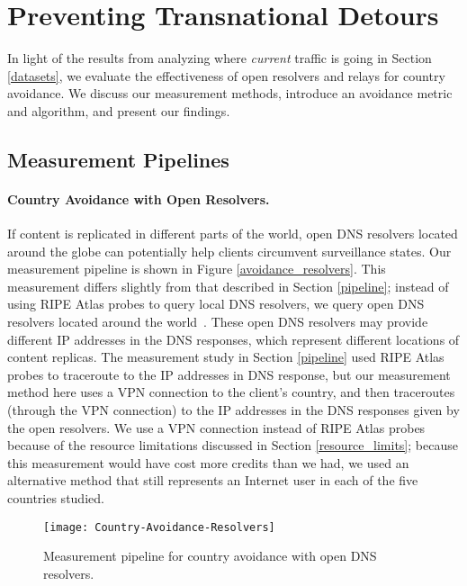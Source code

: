 \section{Preventing Transnational Detours}
\label{avoid_results}
In light of the results from analyzing where \textit{current} traffic is going in Section \ref{datasets}, we evaluate the effectiveness of open resolvers and relays for country avoidance.  We discuss our measurement methods, introduce an avoidance metric and algorithm, and present our findings.

\subsection{Measurement Pipelines}

\paragraph{Country Avoidance with Open Resolvers.} If content is replicated in different parts of the world, open DNS resolvers located around the globe can potentially help clients circumvent surveillance states.  Our measurement pipeline is shown in Figure \ref{avoidance_resolvers}.  This measurement differs slightly from that described in Section \ref{pipeline}; instead of using RIPE Atlas probes to query local DNS resolvers, we query open DNS resolvers located around the world~\cite{open_resolver_list}.  These open DNS resolvers may provide different IP addresses in the DNS responses, which represent different locations of content replicas. The measurement study in Section \ref{pipeline} used RIPE Atlas probes to traceroute to the IP addresses in DNS response, but our measurement method here uses a VPN connection to the client's country, and then traceroutes (through the VPN connection) to the IP addresses in the DNS responses given by the open resolvers.  We use a VPN connection instead of RIPE Atlas probes because of the resource limitations discussed in Section \ref{resource_limits}; because this measurement would have cost more credits than we had, we used an alternative method that still represents an Internet user in each of the five countries studied.

\begin{figure}[t]
\centering
\texttt{[image: Country-Avoidance-Resolvers]}
\caption{Measurement pipeline for country avoidance with open DNS resolvers.}
\label{fig:avoidance_resolvers}
\end{figure}

